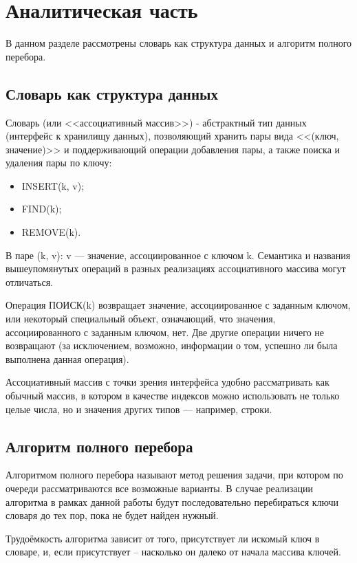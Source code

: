 \chapter{Аналитическая часть}
В данном разделе рассмотрены словарь как структура данных и алгоритм полного перебора.

\section{Словарь как структура данных}

Словарь (или <<ассоциативный массив>>) \cite{dict} - абстрактный тип данных (интерфейс к хранилищу данных), позволяющий хранить пары вида <<(ключ, значение)>> и поддерживающий операции добавления пары, а также поиска и удаления пары по ключу:
\begin{itemize}
	\item INSERT(k, v);
	\item FIND(k);
	\item REMOVE(k).
\end{itemize}

В паре (k, v): v --- значение, ассоциированное с ключом k. Семантика и названия вышеупомянутых операций в разных реализациях ассоциативного массива могут отличаться.

Операция ПОИСК(k) возвращает значение, ассоциированное с заданным ключом, или некоторый специальный объект, означающий, что значения, ассоциированного с заданным ключом, нет. Две другие операции ничего не возвращают (за исключением, возможно, информации о том, успешно ли была выполнена данная операция).

Ассоциативный массив с точки зрения интерфейса удобно рассматривать как обычный массив, в котором в качестве индексов можно использовать не только целые числа, но и значения других типов --- например, строки.

\section{Алгоритм полного перебора}
Алгоритмом полного перебора \cite{AI} называют метод решения задачи, при котором по очереди рассматриваются все возможные варианты. В случае реализации алгоритма в рамках данной работы будут последовательно перебираться ключи словаря до тех пор, пока не будет найден нужный. 

Трудоёмкость алгоритма зависит от того, присутствует ли искомый ключ в словаре, и, если присутствует -- насколько он далеко от начала массива ключей.

